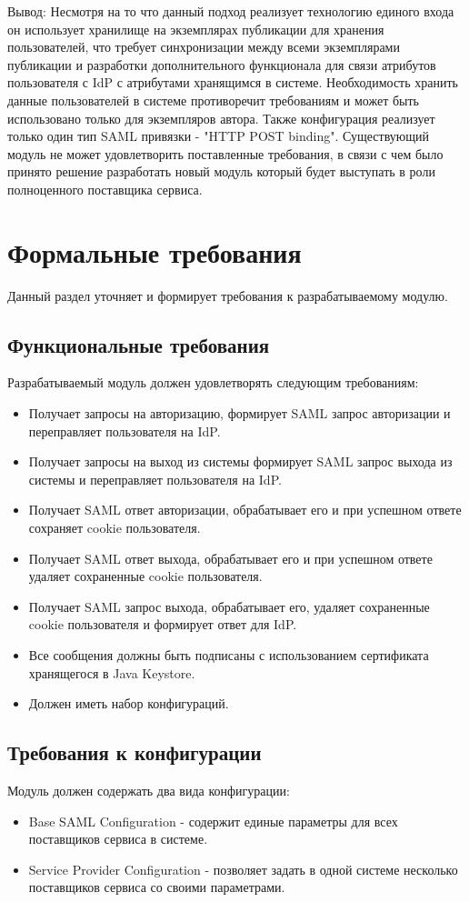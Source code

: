 Вывод: Несмотря на то что данный подход реализует технологию единого входа он использует хранилище на экземплярах публикации для хранения пользователей, что требует синхронизации между всеми экземплярами публикации и разработки дополнительного функционала для связи атрибутов пользователя с IdP с атрибутами  хранящимся в системе. Необходимость хранить данные пользователей в системе противоречит требованиям и может быть использовано только для экземпляров автора. Также конфигурация реализует только один тип SAML привязки - "HTTP POST binding". Существующий модуль не может удовлетворить поставленные требования, в связи с чем было принято решение разработать новый модуль который будет выступать в роли полноценного поставщика сервиса.

\section{Формальные требования}
Данный раздел уточняет и формирует требования к разрабатываемому модулю.

\subsection{Функциональные требования}
Разрабатываемый модуль должен удовлетворять следующим требованиям:
\begin{itemize}
\item Получает запросы на авторизацию, формирует SAML запрос авторизации и  переправляет пользователя на IdP.
\item Получает запросы на выход из системы формирует SAML запрос выхода из системы и переправляет пользователя на IdP.
\item Получает SAML ответ авторизации, обрабатывает его и при успешном ответе сохраняет cookie пользователя.
\item Получает SAML ответ выхода, обрабатывает его и при успешном ответе удаляет сохраненные cookie пользователя.
\item Получает SAML запрос выхода, обрабатывает его, удаляет сохраненные cookie пользователя и формирует ответ для IdP.
\item Все сообщения должны быть подписаны с использованием сертификата хранящегося в Java Keystore.
\item Должен иметь набор конфигураций.
\end{itemize}

\subsection{Требования к конфигурации}
Модуль должен содержать два вида конфигурации:
\begin{itemize}
\item Base SAML Configuration - содержит единые параметры для всех поставщиков сервиса в системе.
\item Service Provider Configuration - позволяет задать в одной системе несколько поставщиков сервиса со своими параметрами. 
\end{itemize}

